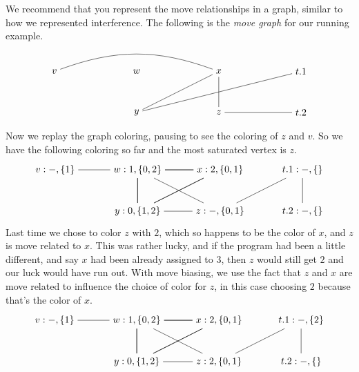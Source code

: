 \documentclass[11pt]{book}
\begin{document}
We recommend that you represent the move relationships in a graph,
similar to how we represented interference.  The following is the
\emph{move graph} for our running example.
\[
\begin{tikzpicture}[baseline=(current  bounding  box.center)]
\node (v) at (0,0)    {$v$};
\node (w) at (3,0)    {$w$};
\node (x) at (6,0)    {$x$};
\node (y) at (3,-1.5) {$y$};
\node (z) at (6,-1.5) {$z$};
\node (t1) at (9,0)   {$t.1$};
\node (t2) at (9,-1.5) {$t.2$};
\draw (t1) to (y);
\draw (t2) to (z);
\draw[bend left=20] (v) to (x);
\draw (x) to (y);
\draw (x) to (z);
\end{tikzpicture}
\]

Now we replay the graph coloring, pausing to see the coloring of $z$
and $v$. So we have the following coloring so far and the most
saturated vertex is $z$.
\[
\begin{tikzpicture}[baseline=(current  bounding  box.center)]
\node (v) at (0,0)    {$v:-,\{1\}$};
\node (w) at (3,0)    {$w:1,\{0,2\}$};
\node (x) at (6,0)    {$x:2,\{0,1\}$};
\node (y) at (3,-1.5) {$y:0,\{1,2\}$};
\node (z) at (6,-1.5) {$z:-,\{0,1\}$};
\node (t1) at (9,0)   {$t.1:-,\{\}$};
\node (t2) at (9,-1.5) {$t.2:-,\{\}$};
\draw (t1) to (z);
\draw (t2) to (t1);
\draw (v) to (w);
\foreach \i in {w,x,y} 
{
  \foreach \j in {w,x,y}
  { 
    \draw (\i) to (\j);
  }
}
\draw (z) to (w);
\draw (z) to (y);
\end{tikzpicture}
\]
Last time we chose to color $z$ with $2$, which so happens to be the
color of $x$, and $z$ is move related to $x$. This was rather lucky,
and if the program had been a little different, and say $x$ had been
already assigned to $3$, then $z$ would still get $2$ and our luck
would have run out. With move biasing, we use the fact that $z$ and
$x$ are move related to influence the choice of color for $z$, in this
case choosing $2$ because that's the color of $x$.
\[
\begin{tikzpicture}[baseline=(current  bounding  box.center)]
\node (v) at (0,0)    {$v:-,\{1\}$};
\node (w) at (3,0)    {$w:1,\{0,2\}$};
\node (x) at (6,0)    {$x:2,\{0,1\}$};
\node (y) at (3,-1.5) {$y:0,\{1,2\}$};
\node (z) at (6,-1.5) {$z:2,\{0,1\}$};
\node (t1) at (9,0)   {$t.1:-,\{2\}$};
\node (t2) at (9,-1.5) {$t.2:-,\{\}$};
\draw (t1) to (z);
\draw (t2) to (t1);
\draw (v) to (w);
\foreach \i in {w,x,y} 
{
  \foreach \j in {w,x,y}
  { 
    \draw (\i) to (\j);
  }
}
\draw (z) to (w);
\draw (z) to (y);
\end{tikzpicture}
\]
\end{document}
